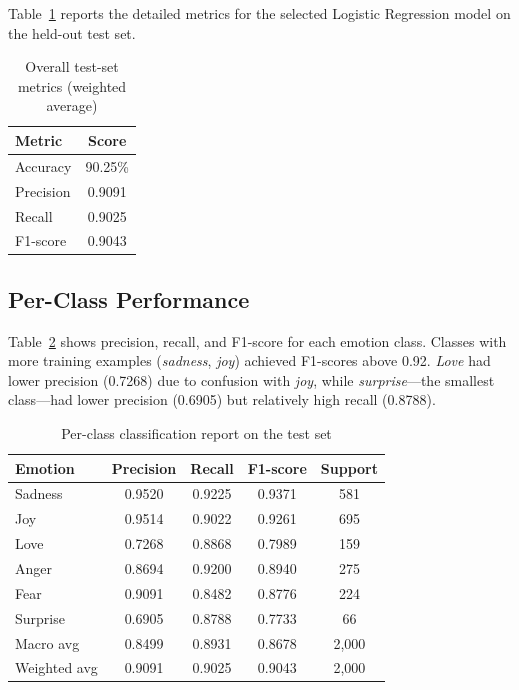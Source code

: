 \documentclass[12pt]{article}
\begin{document}
Table~\ref{tab:overall} reports the detailed metrics for the selected Logistic Regression model on the held-out test set.

\begin{table}[H]
\centering
\caption{Overall test-set metrics (weighted average)}
\label{tab:overall}
\begin{tabular}{lc}
\toprule
\textbf{Metric} & \textbf{Score} \\
\midrule
Accuracy & 90.25\% \\
Precision & 0.9091 \\
Recall & 0.9025 \\
F1-score & 0.9043 \\
\bottomrule
\end{tabular}
\end{table}

\subsection{Per-Class Performance}

Table~\ref{tab:perclass} shows precision, recall, and F1-score for each emotion class.
Classes with more training examples (\textit{sadness}, \textit{joy}) achieved F1-scores above 0.92.
\textit{Love} had lower precision (0.7268) due to confusion with \textit{joy}, while \textit{surprise}---the smallest class---had lower precision (0.6905) but relatively high recall (0.8788).

\begin{table}[H]
\centering
\caption{Per-class classification report on the test set}
\label{tab:perclass}
\begin{tabular}{lcccc}
\toprule
\textbf{Emotion} & \textbf{Precision} & \textbf{Recall} & \textbf{F1-score} & \textbf{Support} \\
\midrule
Sadness & 0.9520 & 0.9225 & 0.9371 & 581 \\
Joy & 0.9514 & 0.9022 & 0.9261 & 695 \\
Love & 0.7268 & 0.8868 & 0.7989 & 159 \\
Anger & 0.8694 & 0.9200 & 0.8940 & 275 \\
Fear & 0.9091 & 0.8482 & 0.8776 & 224 \\
Surprise & 0.6905 & 0.8788 & 0.7733 & 66 \\
\midrule
Macro avg & 0.8499 & 0.8931 & 0.8678 & 2{,}000 \\
Weighted avg & 0.9091 & 0.9025 & 0.9043 & 2{,}000 \\
\bottomrule
\end{tabular}
\end{table}
\end{document}
